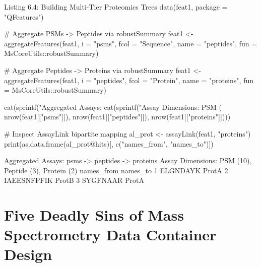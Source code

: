 \documentclass[11pt,twoside,openright]{book}
\begin{document}
\begin{rchunk}{Listing 6.4: Building Multi-Tier Proteomics Trees}
data(feat1, package = "QFeatures")

# Aggregate PSMs -> Peptides via robustSummary
feat1 <- aggregateFeatures(feat1, i = "psms", fcol = "Sequence",
                           name = "peptides", fun = MsCoreUtils::robustSummary)

# Aggregate Peptides -> Proteins via robustSummary
feat1 <- aggregateFeatures(feat1, i = "peptides", fcol = "Protein",
                           name = "proteins", fun = MsCoreUtils::robustSummary)

cat(sprintf("Aggregated Assays: %
cat(sprintf("Assay Dimensions: PSM (%
            nrow(feat1[["psms"]]), nrow(feat1[["peptides"]]), nrow(feat1[["proteins"]])))

# Inspect AssayLink bipartite mapping
al_prot <- assayLink(feat1, "proteins")
print(as.data.frame(al_prot@hits)[, c("names_from", "names_to")])
\end{rchunk}

\begin{routput}
Aggregated Assays: psms -> peptides -> proteins
Assay Dimensions: PSM (10), Peptide (3), Protein (2)
   names\_from names\_to
1    ELGNDAYK    ProtA
2 IAEESNFPFIK    ProtB
3    SYGFNAAR    ProtA
\end{routput}

\section{Five Deadly Sins of Mass Spectrometry Data Container Design}
\label{sec:deadly_sins}
\end{document}
